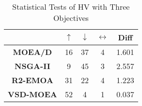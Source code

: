 \begin{table}[t]
\caption{Statistical Tests of HV with Three Objectives}
\label{tab:Tests_HV_3obj}
\centering
\begin{tabular}{c c|c|c|c}
\cline{2-5}
                                        & \textbf{$\uparrow$} & \textbf{$\downarrow$} & \textbf{$\leftrightarrow$} & \textbf{Diff} \\ \hline
\multicolumn{1}{c|}{\textbf{MOEA/D}}   & 16                  & 37                    & 4                          & 1.601         \\ \hline
\multicolumn{1}{c|}{\textbf{NSGA-II}}  & 9                   & 45                    & 3                          & 2.557         \\ \hline
\multicolumn{1}{c|}{\textbf{R2-EMOA}}  & 31                  & 22                    & 4                          & 1.223         \\ \hline
\multicolumn{1}{c|}{\textbf{VSD-MOEA}} & 52                  & 4                     & 1                          & 0.037         \\ \hline
\end{tabular}%
\end{table}



